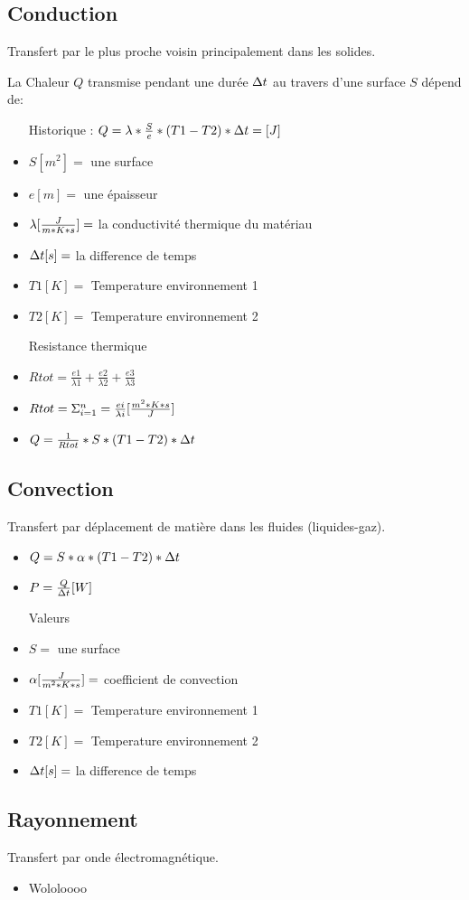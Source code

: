 \subsection{Conduction}
Transfert par le plus proche voisin principalement dans les solides.

La Chaleur $Q$ transmise pendant une durée ${\Delta}t$ au travers d'une surface $S$ dépend de:
\begin{itemize}
    \item[Historique :] $Q = \lambda * \frac{S}{e} *(T1-T2)* {\Delta}t = [J]$
    \item $S [m^2] =$ une surface
    \item $e [m] =$ une épaisseur
    \item $\lambda [\frac{J}{m*K*s}] =$ la conductivité thermique du matériau
    \item ${\Delta}t [s] =$ la difference de temps
    \item $T1 [K]=$ Temperature environnement 1
    \item $T2 [K]=$ Temperature environnement 2
    \item[Resistance thermique]
    \item$Rtot = \frac{e1}{{\lambda}1}+\frac{e2}{{\lambda}2}+\frac{e3}{{\lambda}3}$
    \item$Rtot = \Sigma^{n}_{i=1} = \frac{ei}{{\lambda}i} [\frac{m^2*K*s}{J}]$
    \item$Q = \frac{1}{Rtot} * S *(T1-T2) * {\Delta}t$ 
\end{itemize}



\subsection{Convection}
Transfert par déplacement de matière dans les fluides (liquides-gaz).

\begin{itemize}
    \item $Q = S * \alpha * (T1-T2) * {\Delta}t$
    \item $P = \frac{Q}{{\Delta}t} [W]$
    \item[Valeurs]
    \item $S =$ une surface
    \item $\alpha [\frac{J}{m^2*K*s}]=$ coefficient de convection
    \item $T1 [K]=$ Temperature environnement 1
    \item $T2 [K]=$ Temperature environnement 2
    \item ${\Delta}t [s] =$ la difference de temps
\end{itemize}

\subsection{Rayonnement}
Transfert par onde électromagnétique. 

\begin{itemize}
    \item Wololoooo
\end{itemize}